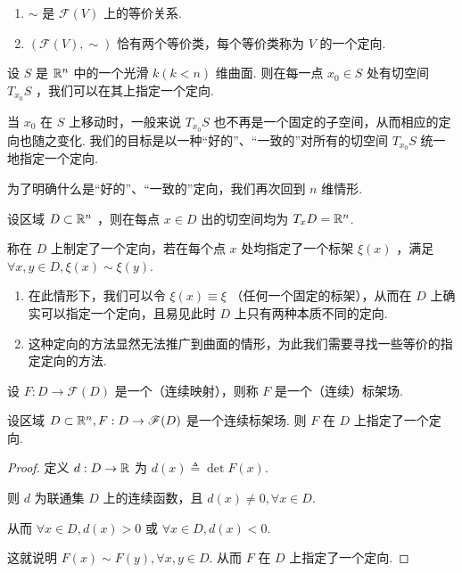 \begin{property}
\begin{enumerate}
    \item $\sim$ 是 $\mathscr{F}(V)$ 上的等价关系.
    
    \item $(\mathscr{F}(V),\sim)$ 恰有两个等价类，每个等价类称为 $V$ 的一个定向.
\end{enumerate}
\end{property}


设 $S$ 是 $\mathbb{R}^n$ 中的一个光滑 $k(k<n)$ 维曲面. 则在每一点 $x_0\in S$ 处有切空间 $T_{x_0}S$ ，我们可以在其上指定一个定向.

当 $x_0$ 在 $S$ 上移动时，一般来说 $T_{x_0}S$ 也不再是一个固定的子空间，从而相应的定向也随之变化. 我们的目标是以一种“好的”、“一致的”对所有的切空间 $T_{x_0}S$ 统一地指定一个定向.

为了明确什么是“好的”、“一致的”定向，我们再次回到 $n$ 维情形.


\begin{definition}
设区域 $D\subset\mathbb{R}^n$ ，则在每点 $x\in D$ 出的切空间均为 $T_xD=\mathbb{R}^n$.

称在 $D$ 上制定了一个定向，若在每个点 $x$ 处均指定了一个标架 $\xi(x)$ ，满足 $\forall x,y\in D,\xi(x)\sim\xi(y)$.
\end{definition}


\begin{hint}
\begin{enumerate}
    \item 在此情形下，我们可以令 $\xi(x)\equiv\xi$ （任何一个固定的标架），从而在 $D$ 上确实可以指定一个定向，且易见此时 $D$ 上只有两种本质不同的定向.
    
    \item 这种定向的方法显然无法推广到曲面的情形，为此我们需要寻找一些等价的指定定向的方法.
\end{enumerate}
\end{hint}

\begin{definition}
设 $F:D\to\mathscr{F}(D)$ 是一个（连续映射），则称 $F$ 是一个（连续）标架场.
\end{definition}

\begin{property}
设区域 $D\subset\mathbb{R}^n,F:D\to\mathscr{F}(D)$ 是一个连续标架场. 则 $F$ 在 $D$ 上指定了一个定向.
\end{property}
\begin{proof}
定义 $d:D\to\mathbb{R}$ 为 $d(x)\triangleq\det F(x)$.

则 $d$ 为联通集 $D$ 上的连续函数，且 $d(x)\ne 0,\forall x\in D$.

从而 $\forall x\in D,d(x)>0$ 或 $\forall x\in D,d(x)<0$.

这就说明 $F(x)\sim F(y),\forall x,y\in D$. 从而 $F$ 在 $D$ 上指定了一个定向.
\end{proof}


